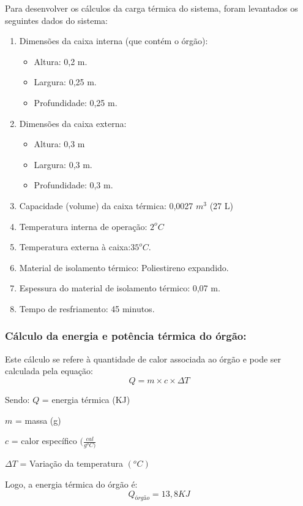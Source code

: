 		Para desenvolver os cálculos da carga térmica do sistema, foram levantados os seguintes dados do sistema:
		\begin{enumerate}
			\item Dimensões da caixa interna (que contém o órgão):
				\begin{itemize}
					\item Altura: 0,2 m.
					\item Largura: 0,25 m.
					\item Profundidade: 0,25 m.
				\end{itemize}
			\item Dimensões da caixa externa:
				\begin{itemize}
					\item Altura: 0,3 m
					\item Largura: 0,3 m.
					\item Profundidade: 0,3 m.
				\end{itemize}
			\item Capacidade (volume) da caixa térmica: 0,0027 $m^3$ (27 L)
			\item Temperatura interna de operação: $2^oC$
			\item Temperatura externa à caixa:$ 35^oC$.
			\item Material de isolamento térmico: Poliestireno expandido.
			\item Espessura do material de isolamento térmico: 0,07 m.
			\item Tempo de resfriamento: 45 minutos.
		\end{enumerate}
		
		\subsubsection{Cálculo da energia e potência térmica do órgão:}
		Este cálculo se refere à quantidade de calor associada ao órgão e pode ser calculada pela equação:
		\begin{equation}
		Q = m \times c \times \Delta T
		\end{equation}
		
		Sendo: 
		$Q$ = energia térmica (KJ)
		
		$m$ = massa (g)
		
		$c$ = calor específico $(\frac{cal}{g^oC)}$
		
		$\Delta T$ = Variação da temperatura $(^oC)$
		
	Logo, a energia térmica do órgão é:
	$$
	Q_{órgão} = 13,8 KJ
	$$	
	
